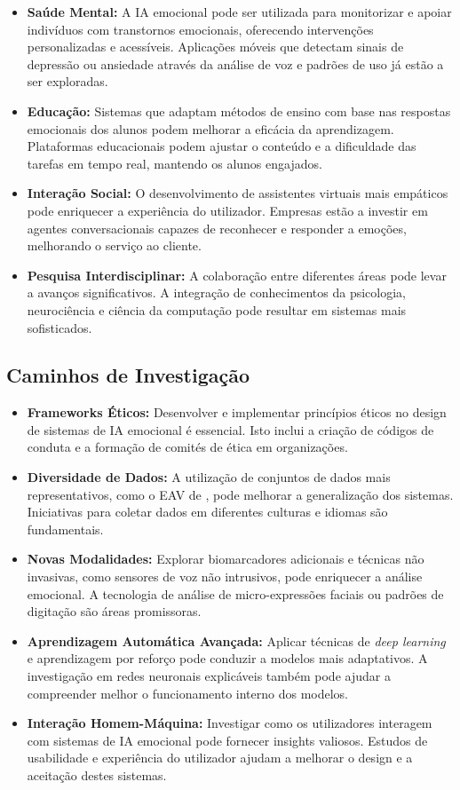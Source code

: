 \documentclass[a4paper,12pt]{report}
\begin{document}
	\begin{itemize}
		\item \textbf{Saúde Mental:} A IA emocional pode ser utilizada para monitorizar e apoiar indivíduos com transtornos emocionais, oferecendo intervenções personalizadas e acessíveis. Aplicações móveis que detectam sinais de depressão ou ansiedade através da análise de voz e padrões de uso já estão a ser exploradas.
		\item \textbf{Educação:} Sistemas que adaptam métodos de ensino com base nas respostas emocionais dos alunos podem melhorar a eficácia da aprendizagem. Plataformas educacionais podem ajustar o conteúdo e a dificuldade das tarefas em tempo real, mantendo os alunos engajados.
		\item \textbf{Interação Social:} O desenvolvimento de assistentes virtuais mais empáticos pode enriquecer a experiência do utilizador. Empresas estão a investir em agentes conversacionais capazes de reconhecer e responder a emoções, melhorando o serviço ao cliente.
		\item \textbf{Pesquisa Interdisciplinar:} A colaboração entre diferentes áreas pode levar a avanços significativos. A integração de conhecimentos da psicologia, neurociência e ciência da computação pode resultar em sistemas mais sofisticados.
	\end{itemize}
	
	\subsection{Caminhos de Investigação}
	
	\begin{itemize}
		\item \textbf{Frameworks Éticos:} Desenvolver e implementar princípios éticos no design de sistemas de IA emocional é essencial. Isto inclui a criação de códigos de conduta e a formação de comités de ética em organizações.
		\item \textbf{Diversidade de Dados:} A utilização de conjuntos de dados mais representativos, como o EAV de \textcite{lee2024}, pode melhorar a generalização dos sistemas. Iniciativas para coletar dados em diferentes culturas e idiomas são fundamentais.
		\item \textbf{Novas Modalidades:} Explorar biomarcadores adicionais e técnicas não invasivas, como sensores de voz não intrusivos, pode enriquecer a análise emocional. A tecnologia de análise de micro-expressões faciais ou padrões de digitação são áreas promissoras.
		\item \textbf{Aprendizagem Automática Avançada:} Aplicar técnicas de \textit{deep learning} e aprendizagem por reforço pode conduzir a modelos mais adaptativos. A investigação em redes neuronais explicáveis também pode ajudar a compreender melhor o funcionamento interno dos modelos.
		\item \textbf{Interação Homem-Máquina:} Investigar como os utilizadores interagem com sistemas de IA emocional pode fornecer insights valiosos. Estudos de usabilidade e experiência do utilizador ajudam a melhorar o design e a aceitação destes sistemas.
	\end{itemize}
	
\end{document}
